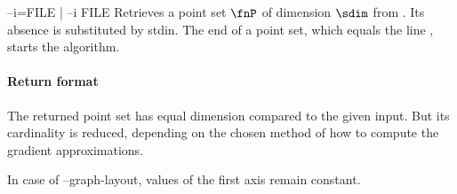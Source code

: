 \begin{procarg}{--i=FILE | --i FILE}
  Retrieves a point set $\fnP$ of dimension $\sdim$ from . Its absence is substituted by stdin. The end of a point set, which equals the line , starts the algorithm.
\end{procarg}

\procargout

\procargsilent

\paragraph{Return format}

The returned point set has equal dimension compared to the given input. But its cardinality is reduced, depending on the chosen method of how to compute the gradient  approximations.

In case of --graph-layout, values of the first axis remain constant.

